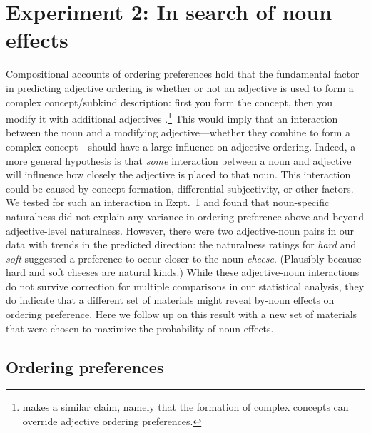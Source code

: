 \documentclass[12pt]{article}
\begin{document}
%










\section{Experiment 2: In search of noun effects}

Compositional accounts of ordering preferences hold that the fundamental factor in predicting adjective ordering is whether or not an adjective is used to form a complex concept/subkind description: first you form the concept, then you modify it with additional adjectives \citep{McNally2004,svenonius2008}.\footnote{\cite{bouchard2005} makes a similar claim, namely that the formation of complex concepts can override adjective ordering preferences.} 
This would imply that an interaction between the noun and a modifying adjective---whether they combine to form a complex concept---should have a large influence on adjective ordering. 
Indeed, a more general hypothesis is that \emph{some} interaction between a noun and adjective will influence how closely the adjective is placed to that noun. This interaction could be caused by concept-formation, differential subjectivity, or other factors. We tested for such an interaction in Expt.~1 and found that noun-specific naturalness did not explain any variance in ordering preference above and beyond adjective-level naturalness. However, there were two adjective-noun pairs in our data with trends in the predicted direction: the naturalness ratings for \emph{hard} and \emph{soft} suggested a preference to occur closer to the noun \emph{cheese}. (Plausibly because hard and soft cheeses are natural kinds.) While these adjective-noun interactions do not survive correction for multiple comparisons in our statistical analysis, they do indicate that a different set of materials might reveal by-noun effects on ordering preference. Here we follow up on this result with a new set of materials that were chosen to maximize the probability of noun effects.


\subsection{Ordering preferences}
\end{document}
